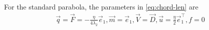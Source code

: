 \documentclass[journal,12pt,onecolumn]{IEEEtran}
\renewcommand\thesection{\arabic{section}}
\begin{document}
\begin{enumerate}[label=\thesection.\arabic*.,ref=\thesection.\theenumi]
For the standard parabola, the parameters in 
\eqref{eq:chord-len} are
\begin{align}  
	\vec{q} =\vec{F} =  -\frac{\eta}{4\lambda_2}\vec{e}_1, \vec{m} = \vec{e}_1, \vec{V} = \vec{D},
	\vec{u} = \frac{\eta}{2}\vec{e}_1^{\top}, f = 0
\end{align}  


\end{enumerate}
\end{document}
